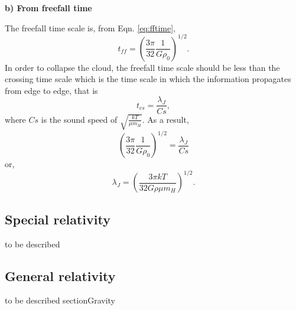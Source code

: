 \textbf{b) From freefall time}

The freefall time scale is, from Eqn. \ref{eq:fftime}, 
\begin{equation}
  t_{ff} = \left( \frac{3\pi}{32} \frac{1}{G \rho_{0}}\right)^{1/2}.
\end{equation}
In order to collapse the cloud, the freefall time scale should be less than the crossing time scale which 
is the time scale in which the information propagates from edge to edge, that is
\begin{equation}
   t_{cs} = \frac{\lambda_{J}}{Cs},
\end{equation}
where $Cs$ is the sound speed of $\sqrt{\frac{kT}{\mu m_{H}}}$. As a result,
\begin{equation}
   \left( \frac{3\pi}{32} \frac{1}{G \rho_{0}}\right)^{1/2} = \frac{\lambda_{J}}{Cs}
\end{equation}
or,
\begin{equation}
   \lambda_{J} = \left( \frac{3\pi k T}{32 G \rho \mu m_{H}} \right)^{1/2}.
\end{equation}

\bigskip
\subsection{Special relativity}
to be described

\bigskip
\subsection{General relativity}
to be described
section{Gravity}
